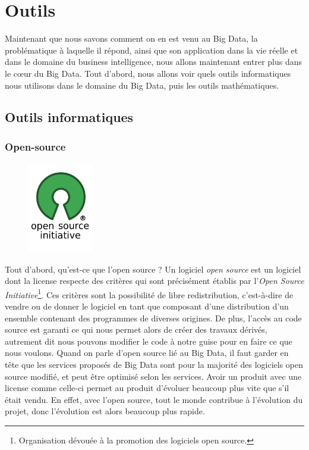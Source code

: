 \documentclass[12pt]{article}
\begin{document}
\section{Outils}
Maintenant que nous savons comment on en est venu au Big Data, la problématique à laquelle il répond, ainsi que son application dans la vie réelle et dans le domaine du business intelligence, nous allons maintenant entrer plus dans le cœur du Big Data. Tout d'abord, nous allons voir quels outils informatiques nous utilisons dans le domaine du Big Data, puis les outils mathématiques.
\subsection{Outils informatiques}
\subsubsection{Open-source}
\begin{figure}[H]
\centering
\includegraphics[width=0.25\textwidth]{Opensource}
\end{figure}
Tout d'abord, qu'est-ce que l'open source ? Un logiciel \emph{open source} est un logiciel dont la license respecte des critères qui sont précisément établis par l'\emph{Open Source Initiative}\footnote{Organisation dévouée à la promotion des logiciels open source.}.
Ces critères sont la possibilité de libre redistribution, c'est-à-dire de vendre ou de donner le logiciel en tant que composant d'une distribution d'un ensemble contenant des programmes de diverses origines. De plus, l'accès au code source est garanti ce qui nous permet alors de créer des travaux dérivés, autrement dit nous pouvons modifier le code à notre guise pour en faire ce que nous voulons. Quand on parle d'open source lié au Big Data, il faut garder en tête que les services proposés de Big Data sont pour la majorité des logiciels open source modifié, et peut être optimisé selon les services. Avoir un produit avec une license comme celle-ci permet au produit d'évoluer beaucoup plus vite que s'il était vendu. En effet, avec l'open source, tout le monde contribue à l'évolution du projet, donc l'évolution est alors beaucoup plus rapide. 
\end{document}
